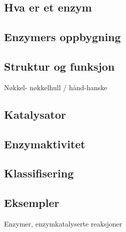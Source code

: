 \subsection{Hva er et enzym}

\subsection{Enzymers oppbygning}

\subsection{Struktur og funksjon}
    Nøkkel- nøkkelhull / hånd-hanske

\subsection{Katalysator}

\subsection{Enzymaktivitet}

\subsection{Klassifisering}

\subsection{Eksempler}
    Enzymer, enzymkatalyserte reaksjoner